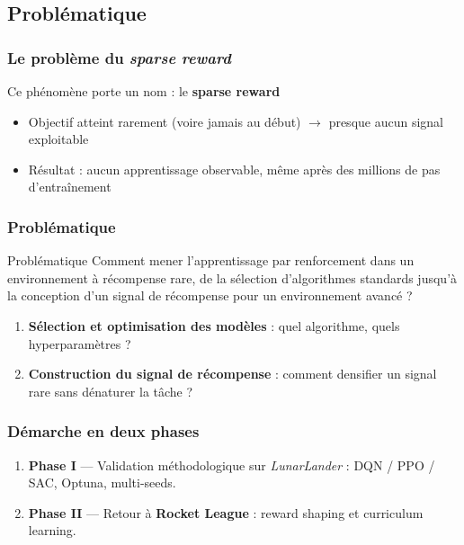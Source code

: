 \documentclass{beamer}
\begin{document}
\subsection{Problématique}
\begin{frame}
\frametitle{Le problème du \emph{sparse reward}}

Ce phénomène porte un nom : le \textbf{sparse reward} \nocite{narvekarCurriculumLearningReinforcement2020}

\vspace{0.3cm}

\pause

\begin{itemize}
    \item Objectif atteint rarement (voire jamais au début) $\rightarrow$
    presque aucun signal exploitable
    \item Résultat : aucun apprentissage observable, même après des
    millions de pas d'entraînement
\end{itemize}

\end{frame}

\begin{frame}
\frametitle{Problématique}



\begin{beamerboxesrounded}[scheme=madrid]{Problématique}
Comment mener l'apprentissage par renforcement dans un environnement
à récompense rare, de la sélection d'algorithmes standards jusqu'à la
conception d'un signal de récompense pour un environnement avancé ?    
\end{beamerboxesrounded}


\vspace{0.5cm}

\pause

\begin{enumerate}
    \item \textbf{Sélection et optimisation des modèles} : quel
    algorithme, quels hyperparamètres ?
    \item \textbf{Construction du signal de récompense} : comment
    densifier un signal rare sans dénaturer la tâche ?
\end{enumerate}

\end{frame}

\begin{frame}
\frametitle{Démarche en deux phases}

\begin{enumerate}
    \item \textbf{Phase I} — Validation méthodologique sur
    \emph{LunarLander} : DQN / PPO / SAC, Optuna, multi-seeds. \pause
    \item \textbf{Phase II} — Retour à \textbf{Rocket League} :
    reward shaping et curriculum learning.
\end{enumerate}

\end{frame}
\end{document}
